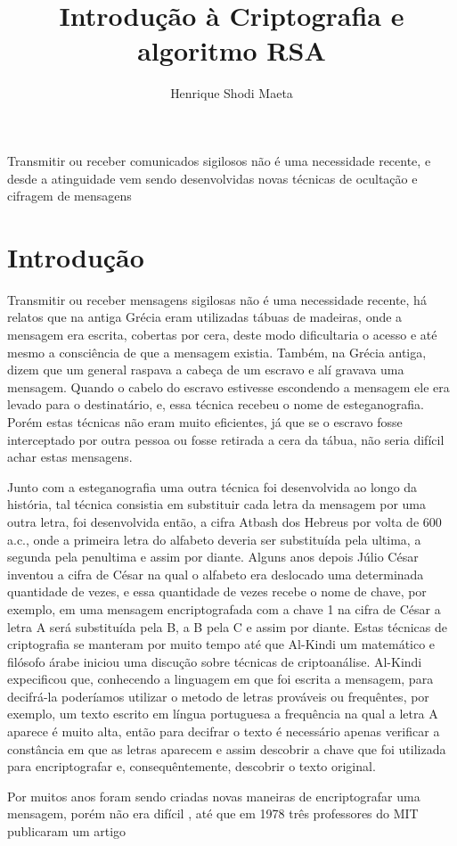 \documentclass[12pt]{article}
\title{Introdu\c c\~{a}o \`{a} Criptografia e algoritmo RSA}
\author{Henrique Shodi Maeta}
\begin{document}
 

\maketitle

\begin{abstract}
  
\end{abstract}
     
\begin{resumo} 
Transmitir ou receber comunicados sigilosos n\~{a}o \'{e} uma necessidade recente, e desde a atinguidade vem sendo desenvolvidas novas t\'{e}cnicas de oculta\c c\~{a}o e cifragem de mensagens
\end{resumo}


\section{Introdu\c c\~{a}o}


 Transmitir ou receber mensagens sigilosas n\~{a}o \'{e} uma necessidade recente, h\'{a} relatos que na antiga Gr\'{e}cia eram utilizadas t\'{a}buas de madeiras, onde a mensagem era escrita, cobertas por cera, deste modo dificultaria o acesso e at\'{e} mesmo a consci\^{e}ncia de que a mensagem existia. Tamb\'{e}m, na Gr\'{e}cia antiga, dizem que um general raspava a cabe\c ca de um escravo e al\'{i} gravava uma mensagem. Quando o cabelo do escravo estivesse escondendo a mensagem ele era levado para o destinat\'{a}rio, e, essa t\'{e}cnica recebeu o nome de esteganografia. Por\'{e}m estas t\'{e}cnicas n\~{a}o eram muito eficientes, j\'{a} que se o escravo fosse interceptado por outra pessoa ou fosse retirada a cera da t\'{a}bua, n\~{a}o seria dif\'{i}cil achar estas mensagens. 
 
 Junto com a esteganografia uma outra t\'{e}cnica foi desenvolvida ao longo da hist\'{o}ria, tal t\'{e}cnica consistia em substituir cada letra da mensagem por uma outra letra, foi desenvolvida ent\~{a}o, a cifra Atbash dos Hebreus por volta de 600 a.c., onde a primeira letra do alfabeto deveria ser substitu\'{i}da pela ultima, a segunda pela penultima e assim por diante. Alguns anos depois J\'{u}lio C\'{e}sar inventou a cifra de C\'{e}sar na qual o alfabeto era deslocado uma determinada quantidade de vezes, e essa quantidade de vezes recebe o nome de chave, por exemplo, em uma mensagem encriptografada com a chave 1 na cifra de C\'{e}sar a letra A ser\'{a} substitu\'{i}da pela B, a B pela C e assim por diante. Estas t\'{e}cnicas de criptografia se manteram por muito tempo at\'{e} que Al-Kindi um matem\'{a}tico e fil\'{o}sofo \'{a}rabe iniciou uma discu\c c\~{a}o sobre t\'{e}cnicas de criptoan\'{a}lise. Al-Kindi expecificou que, conhecendo a linguagem em que foi escrita a mensagem, para decifr\'{a}-la poder\'{i}amos utilizar o metodo de letras prov\'{a}veis ou frequ\^{e}ntes, por exemplo, um texto escrito em l\'{i}ngua portuguesa a frequ\^{e}ncia na qual a letra A aparece \'{e} muito alta, ent\~{a}o para decifrar o texto \'{e} necess\'{a}rio apenas verificar a const\^{a}ncia em que as letras aparecem e assim descobrir a chave que foi utilizada para encriptografar e, consequ\^{e}ntemente, descobrir o texto original.
 
 Por muitos anos foram sendo criadas novas maneiras de encriptografar uma mensagem, por\'{e}m n\~{a}o era dif\'{i}cil , at\'{e} que em 1978 tr\^{e}s professores do MIT publicaram um artigo  




\end{document}
